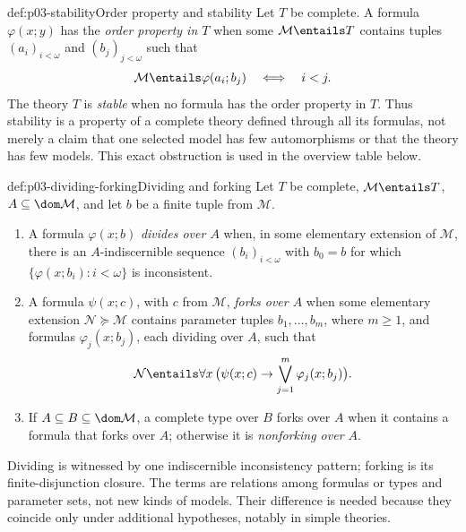 \begin{hbdefinition}{def:p03-stability}{Order property and stability}
Let \(T\) be complete.  A formula \(\varphi(x;y)\) has the \emph{order
property in \(T\)} when some \(\mathcal M\entails T\) contains tuples
\((a_i)_{i<\omega}\) and \((b_j)_{j<\omega}\) such that
\[
 \mathcal M\entails\varphi(a_i;b_j)
 \quad\Longleftrightarrow\quad i<j.
\]
The theory \(T\) is \emph{stable} when no formula has the order property in
\(T\).  Thus stability is a property of a complete theory defined through
all its formulas, not merely a claim that one selected model has few
automorphisms or that the theory has few models.  This exact obstruction is
used in the overview table below.
\end{hbdefinition}

\begin{hbdefinition}{def:p03-dividing-forking}{Dividing and forking}
Let \(T\) be complete, \(\mathcal M\entails T\), \(A\subseteq\dom\mathcal M\),
and let \(b\) be a finite tuple from \(\mathcal M\).
\begin{enumerate}
  \item A formula \(\varphi(x;b)\) \emph{divides over \(A\)} when, in some
        elementary extension of \(\mathcal M\), there is an
        \(A\)-indiscernible sequence \((b_i)_{i<\omega}\) with \(b_0=b\)
        for which \(\{\varphi(x;b_i):i<\omega\}\) is inconsistent.
  \item A formula \(\psi(x;c)\), with \(c\) from \(\mathcal M\),
        \emph{forks over \(A\)} when some elementary extension
        \(\mathcal N\succcurlyeq\mathcal M\) contains parameter tuples
        \(b_1,\ldots,b_m\), where \(m\geq1\), and formulas
        \(\varphi_j(x;b_j)\), each dividing
        over \(A\), such that
        \[
          \mathcal N\entails\forall x\,
          \bigl(\psi(x;c)\to\bigvee_{j=1}^{m}\varphi_j(x;b_j)\bigr).
        \]
  \item If \(A\subseteq B\subseteq\dom\mathcal M\), a complete type over
        \(B\) forks over \(A\) when it contains a formula that forks over
        \(A\); otherwise it is \emph{nonforking over \(A\)}.
\end{enumerate}
Dividing is witnessed by one indiscernible inconsistency pattern; forking is
its finite-disjunction closure.  The terms are relations among formulas or
types and parameter sets, not new kinds of models.  Their difference is
needed because they coincide only under additional hypotheses, notably in
simple theories.
\end{hbdefinition}

